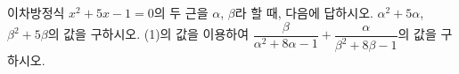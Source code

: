 이차방정식 $x^2+5x-1=0$의 두 근을 $\alpha$, $\beta$라 할 때, 다음에 답하시오.
 $\alpha^2+5\alpha$, $\beta^2+5\beta$의 값을 구하시오.
 (1)의 값을 이용하여 $\dfrac{\beta}{\alpha^2+8\alpha-1}+\dfrac{\alpha}{\beta^2+8\beta-1}$의 값을 구하시오.
